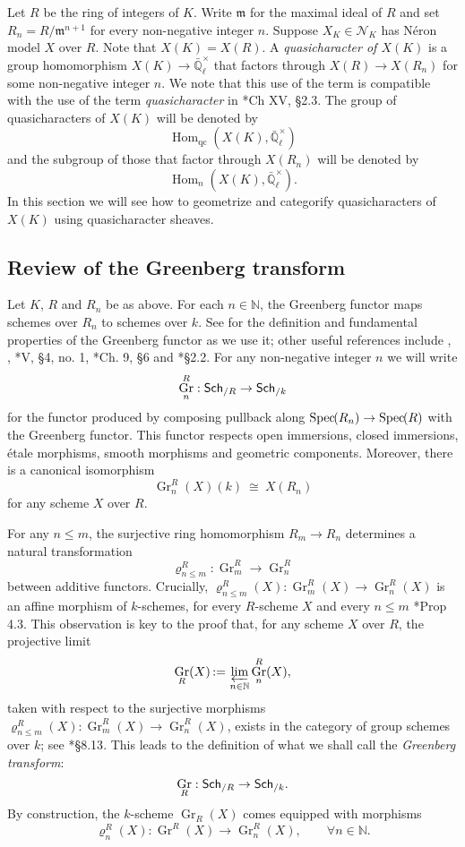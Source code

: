 \documentclass[CM,Submssn,SecEq]{degruyter-crelle} %
\theoremstyle{plain}
\theoremstyle{definition}
\theoremstyle{remark}
\newcommand{\NN}{{\mathbb{N}}}
\newcommand{\EE}{\mathbb{\bar Q}_\ell}
\newcommand{\Fq}{k}
\newcommand{\EEx}{\EE^\times}
\newcommand{\m}{{\mathfrak{m}}}
\DeclareMathOperator{\Hom}{Hom}
\DeclareMathOperator{\Gr}{Gr}
\newcommand{\Spec}[1]{{\operatorname{Spec}\hskip-1pt( #1 )}}
\newcommand{\ceq}{{\, :=\, }}
\newcommand{\iso}{{\ \cong\ }}
\newcommand{\catname}[1]{\normalfont{\textsf{#1}}}
\newcommand{\Sch}[1]{{\catname{Sch}_{/#1}}}
\begin{document}
Let $R$ be the ring of integers of $K$.
Write $\m$ for the maximal ideal of $R$ and set $R_n = R/\m^{n+1}$ for every non-negative integer $n$.
Suppose $X_K \in \mathcal{N}_K$ has N\'eron model $X$ over $R$.
Note that $X(K) = X(R)$.
A \emph{quasicharacter of $X(K)$} is a group homomorphism $X(K) \to \EEx$ that factors through $X(R) \to X(R_n)$ for some non-negative integer $n$.
We note that this use of the term is compatible with the use of the term {\it quasicharacter} in \cite{cassels-frohlich:AlgebraicNumberTheory}*{Ch XV, \S 2.3}.
The group of quasicharacters of $X(K)$ will be denoted by 
\[
\Hom_\text{qc}(X(K),\EEx)
\]
 and the subgroup of those that factor through $X(R_n)$ will be denoted by 
 \[
 \Hom_n(X(K),\EEx).
\]
In this section we will see how to geometrize and categorify quasicharacters of $X(K)$ using quasicharacter sheaves.

\subsection{Review of the Greenberg transform} \label{ssec:rev_Greenberg}

Let $K$, $R$ and $R_n$ be as above.
For each $n \in \NN$, the Greenberg functor maps schemes over $R_n$ to schemes over $\Fq$.
See \cite{bertrapelle-gonzales:Greenberg} for the definition and fundamental properties of the Greenberg functor as we use it; other useful references include
\cite{greenberg:61}, \cite{greenberg:63a},
\cite{demazure-gabriel:GroupesAlgebriques}*{V, \S 4, no. 1},
\cite{bosch-lutkebohmert-reynaud:NeronModels}*{Ch. 9, \S 6} and
\cite{nicaise-sebag:motivicSerre}*{\S 2.2}. %
%
For any non-negative integer $n$ we will write
\[
\Gr^R_n : \Sch{R} \to \Sch{\Fq}
\]
for the functor produced by composing pullback along $\Spec{R_n} \to \Spec{R}$ with the Greenberg functor. 
This functor respects open immersions, closed immersions, \'etale morphisms, smooth morphisms and geometric components.  Moreover, there is a canonical isomorphism
\[
\Gr^R_n(X)(\Fq) \iso X(R_n)
\]
for any scheme $X$ over $R$.

For any $n\leq m$,  the surjective ring homomorphism $R_{m} \to R_n$ determines a
natural transformation 
\[
\varrho^R_{n\leq m} : \Gr^R_{m} \to \Gr^R_n
\]
between additive functors.
Crucially, $\varrho^R_{n\leq m}(X): \Gr^R_{m}(X)\to \Gr^R_n(X)$ is an affine morphism of $\Fq$-schemes, for every $R$-scheme $X$ and every $n\leq m$ \cite{bertrapelle-gonzales:Greenberg}*{Prop 4.3}.
This observation is key to the proof that, for any scheme $X$ over $R$, the projective limit 
\[
\Gr_R(X) \ceq \varprojlim_{n\in \NN} \Gr^R_n(X),
\]
taken with respect to the surjective morphisms $\varrho^R_{n\leq m}(X) : \Gr^R_{m}(X) \to \Gr^R_n(X)$,
exists in the category of group schemes over $\Fq$;
see \cite{EGAIV3}*{\S 8.13}.
This leads to the definition of what we shall call the {\it Greenberg transform}:
\[
\Gr_R : \Sch{R} \to \Sch{\Fq}.
\]
By construction, the $\Fq$-scheme $\Gr_R(X)$ comes equipped with morphisms 
\[
\varrho^R_n(X) : \Gr^R(X) \to \Gr^R_n(X),\qquad \forall n\in \NN.
\]
\end{document}
